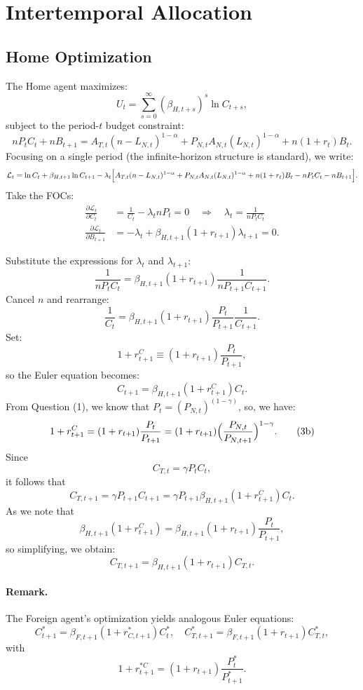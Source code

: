 \documentclass[a4paper,12pt]{article} %
\theoremstyle{nonitalic}
\begin{document}
\section{Intertemporal Allocation}

\subsection*{Home Optimization}
The Home agent maximizes:
\[
U_t = \sum_{s=0}^{\infty} (\beta_{H,t+s})^s \ln C_{t+s},
\]
subject to the period-$ t $ budget constraint:
\[
n P_t C_t + n B_{t+1} = A_{T,t} (n-L_{N,t})^{ 1-\alpha} + P_{N,t} A_{N,t} (L_{N,t})^{ 1-\alpha} + n(1+r_t)B_t.
\]
Focusing on a single period (the infinite-horizon structure is standard), we write:
\[
\mathcal{L}_t = \ln C_t + \beta_{H,t+1}\ln C_{t+1} - \lambda_t \Bigl[A_{T,t}(n-L_{N,t})^{1-\alpha} + P_{N,t}A_{N,t}(L_{N,t})^{1-\alpha} + n(1+r_t)B_t - n P_t C_t - n B_{t+1}\Bigr].
\]
Take the FOCs:
\begin{align*}
    \frac{\partial \mathcal{L}_t}{\partial C_t} &= \frac{1}{C_t} - \lambda_t nP_t = 0 \quad \Rightarrow \quad \lambda_t = \frac{1}{nP_t C_t} \\
    \frac{\partial \mathcal{L}_t}{\partial B_{t+1}} &= -\lambda_t + \beta_{H,t+1}(1+r_{t+1}) \lambda_{t+1} = 0.
\end{align*}

Substitute the expressions for \(\lambda_t\) and \(\lambda_{t+1}\):
\[
\frac{1}{nP_t C_t} = \beta_{H,t+1}(1+r_{t+1})\frac{1}{nP_{t+1} C_{t+1}}.
\]
Cancel \(n\) and rearrange:
\[
\frac{1}{C_t} = \beta_{H,t+1}(1+r_{t+1})\frac{P_t}{P_{t+1}}\frac{1}{C_{t+1}}.
\]
Set:
\[
1 + r_{t+1}^C \equiv (1+r_{t+1})\frac{P_t}{P_{t+1}},
\]
so the Euler equation becomes:
\[
C_{t+1} = \beta_{H,t+1}(1+r_{t+1}^C)  C_t. \tag{3a}
\]
From Question (1), we know that $P_t = (P_{N,t})^{(1-\gamma)}$,
so, we have:
\[
1 + r_{t+1}^C = (1+r_{t+1})\frac{P_t}{P_{t+1}} = (1+r_{t+1})\Bigl(\frac{P_{N,t}}{P_{N,t+1}}\Bigr)^{1-\gamma}. \tag{3b}
\]
Since
\[
C_{T,t} = \gamma P_t C_t,
\]
it follows that
\[
C_{T,t+1} = \gamma P_{t+1} C_{t+1} = \gamma P_{t+1} \beta_{H,t+1}(1+r_{t+1}^C) C_t.
\]
As we note that
\[
\beta_{H,t+1}(1+r_{t+1}^C) = \beta_{H,t+1}(1+r_{t+1})\frac{P_t}{P_{t+1}},
\]
so simplifying, we obtain:
\[
C_{T,t+1} = \beta_{H,t+1}(1+r_{t+1})  C_{T,t}. \tag{3c}
\]

\paragraph{Remark.}  
The Foreign agent's optimization yields analogous Euler equations:
\[
C_{t+1}^* = \beta_{F,t+1}(1+r_{C,t+1}^*)  C_t^*,\quad
C_{T,t+1}^* = \beta_{F,t+1}(1+r_{t+1}) C_{T,t}^*,
\]
with
\[
1+r_{t+1}^{*C} = (1+r_{t+1})\frac{P_t^*}{P_{t+1}^*}.
\]
\end{document}
